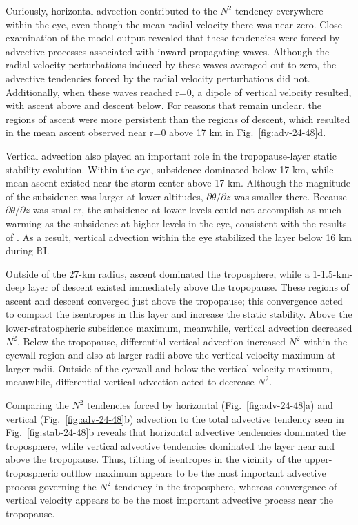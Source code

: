 Curiously, horizontal advection contributed to the $N^2$ tendency everywhere within the eye, even though the mean radial velocity there was near zero.
Close examination of the model output revealed that these tendencies were forced by advective processes associated with inward-propagating waves.
Although the radial velocity perturbations induced by these waves averaged out to zero, the advective tendencies forced by the radial velocity perturbations did not.
Additionally, when these waves reached r=0, a dipole of vertical velocity resulted, with ascent above and descent below.
For reasons that remain unclear, the regions of ascent were more persistent than the regions of descent, which resulted in the mean ascent observed near r=0 above 17 km in Fig.~\ref{fig:adv-24-48}d.

Vertical advection also played an important role in the tropopause-layer static stability evolution.
Within the eye, subsidence dominated below 17 km, while mean ascent existed near the storm center above 17 km.
Although the magnitude of the subsidence was larger at lower altitudes, $\partial \theta/\partial z$ was smaller there.
Because $\partial \theta/\partial z$ was smaller, the subsidence at lower levels could not accomplish as much warming as the subsidence at higher levels in the eye, consistent with the results of \cite{SternZhang2013}.
As a result, vertical advection within the eye stabilized the layer below 16 km during RI.

Outside of the 27-km radius, ascent dominated the troposphere, while a 1-1.5-km-deep layer of descent existed immediately above the tropopause.
These regions of ascent and descent converged just above the tropopause; this convergence acted to compact the isentropes in this layer and increase the static stability.
Above the lower-stratospheric subsidence maximum, meanwhile, vertical advection decreased $N^2$.
Below the tropopause, differential vertical advection increased $N^2$ within the eyewall region and also at larger radii above the vertical velocity maximum at larger radii.
Outside of the eyewall and below the vertical velocity maximum, meanwhile, differential vertical advection acted to decrease $N^2$.

Comparing the $N^2$ tendencies forced by horizontal (Fig.~\ref{fig:adv-24-48}a) and vertical (Fig.~\ref{fig:adv-24-48}b) advection to the total advective tendency seen in Fig.~\ref{fig:stab-24-48}b reveals that horizontal advective tendencies dominated the troposphere, while vertical advective tendencies dominated the layer near and above the tropopause.
Thus, tilting of isentropes in the vicinity of the upper-tropospheric outflow maximum appears to be the most important advective process governing the $N^2$ tendency in the troposphere, whereas convergence of vertical velocity appears to be the most important advective process near the tropopause.


